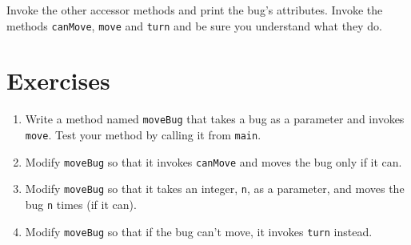 Invoke the other accessor methods and print the bug's attributes.
Invoke the methods {\tt canMove}, {\tt move} and {\tt turn} and
be sure you understand what they do.  %


\section{Exercises}

\begin{exercise}

\begin{enumerate}

\item Write a method named {\tt moveBug} that takes a bug as a parameter
and invokes {\tt move}.  Test your method by calling it from {\tt main}.

\item Modify {\tt moveBug} so that it invokes {\tt canMove} and moves
the bug only if it can.

\item Modify {\tt moveBug} so that it takes an integer, {\tt n}, as a
parameter, and moves the bug {\tt n} times (if it can).

\item Modify {\tt moveBug} so that if the bug can't move, it invokes
{\tt turn} instead.

\end{enumerate}
\end{exercise}


